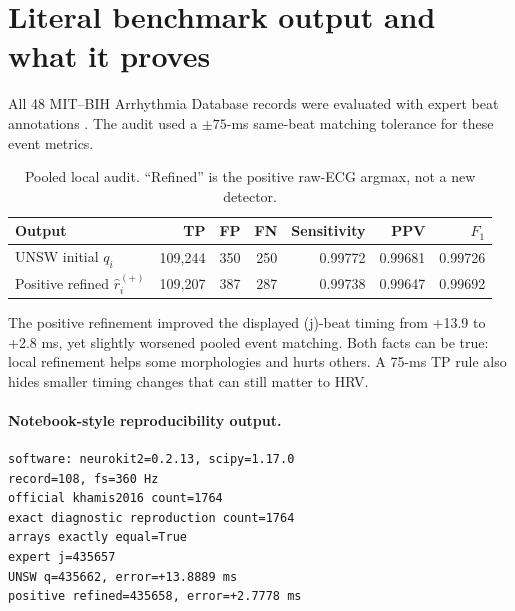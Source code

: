 \documentclass[11pt]{article}
\begin{document}
\clearpage
\section{Literal benchmark output and what it proves}
All 48 MIT--BIH Arrhythmia Database records were evaluated with expert beat annotations \cite{goldberger2000physiobank,moody2001mitbih,physionetmitdb}.  The audit used a \(\pm75\)-ms same-beat matching tolerance for these event metrics.

\begin{table}[H]
\centering
\caption{Pooled local audit. ``Refined'' is the positive raw-ECG argmax, not a new detector.}
\begin{tabular}{@{}lrrrrrr@{}}
\toprule
Output & TP & FP & FN & Sensitivity & PPV & \(F_1\) \\
\midrule
UNSW initial \(q_i\) & 109,244 & 350 & 250 & 0.99772 & 0.99681 & 0.99726 \\
Positive refined \(\hat r_i^{(+)}\) & 109,207 & 387 & 287 & 0.99738 & 0.99647 & 0.99692 \\
\bottomrule
\end{tabular}
\end{table}

The positive refinement improved the displayed (j)-beat timing from +13.9 to +2.8 ms, yet slightly worsened pooled event matching.  Both facts can be true: local refinement helps some morphologies and hurts others.  A 75-ms TP rule also hides smaller timing changes that can still matter to HRV.

\paragraph{Notebook-style reproducibility output.}
\begin{lstlisting}
software: neurokit2=0.2.13, scipy=1.17.0
record=108, fs=360 Hz
official khamis2016 count=1764
exact diagnostic reproduction count=1764
arrays exactly equal=True
expert j=435657
UNSW q=435662, error=+13.8889 ms
positive refined=435658, error=+2.7778 ms
\end{lstlisting}
\end{document}
